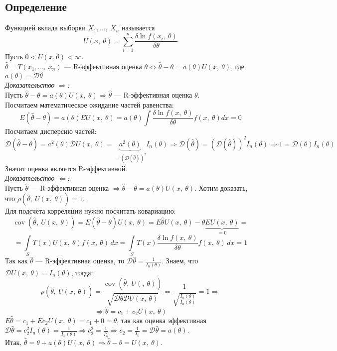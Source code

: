 \documentclass[12pt, a4paper]{article}
\newcommand{\sion}{\sum\limits_{i = 1}^{n}}
\newcommand{\dev}{\mathcal{D}}
\newcommand{\cov}{\operatorname{cov}}
\begin{document}
\subsection*{Определение}
Функцией вклада выборки $X_1,\dots,\ X_n$ называется
\[U(x,\ \theta) = \sion \frac{\delta \ln f(x_i,\ \theta)}{\delta \theta}\]
Пусть $0 < U(x, \theta) < \infty$.\\
$\hat{\theta} = T(x_1,\dots,\ x_n)$ --- R-эффективная оценка $\theta \Leftrightarrow \hat{\theta} - \theta = a(\theta) U(x,\ \theta)$, где $a(\theta) = \mathcal{D}\hat{\theta}$\\
\textit{Доказательство} $\Rightarrow$:\\
Пусть $\hat{\theta} - \theta = a(\theta) U(x,\ \theta) \Rightarrow \hat{\theta}$ --- R-эффективная оценка $\theta$.\\
Посчитаем математическое ожидание частей равенства:
\[E(\hat{\theta} - \theta) = a(\theta) EU(x,\ \theta) = a(\theta) \int \frac{\delta \ln f(x,\ \theta)}{\delta \theta} f(x,\ \theta) dx = 0\]
Посчитаем дисперсию частей:
\[\dev (\hat{\theta} - \theta) = a^2(\theta) \dev U(x,\ \theta) = \underset{=(\dev(\hat{\theta}))^2}{\underbrace{a^2(\theta)}} I_n(\theta)\Rightarrow \dev(\hat{\theta}) = (\dev(\hat{\theta}))^2 I_n(\theta)\Rightarrow 1 = \dev(\theta) I_n(\theta)\]
Значит оценка является R-эффективной.\\
\textit{Доказательство} $\Leftarrow$:\\
Пусть $\hat{\theta}$ --- R-эффективная оценка $\Rightarrow \hat{\theta} - \theta = a(\theta) U(x,\ \theta)$. Хотим доказать, что $\rho(\hat{\theta},\ U(x,\ \theta)) = 1$.\\
Для подсчёта корреляции нужно посчитать ковариацию:
\[\cov (\hat{\theta},\ U(x,\ \theta)) = E(\hat{\theta} - \theta) U(x,\ \theta) = E\hat{\theta} U(x,\ \theta) - \theta \underset{=0}{\underbrace{EU(x,\ \theta)}} =\]
\[= \int\limits_S T(x)U(x,\ \theta) f(x,\ \theta)\, dx = \int\limits_S T(x) \frac{\delta \ln f(x,\ \theta)}{\delta \theta}f(x,\ \theta)\, dx = 1\]
Так как $\hat{\theta}$ --- R-эффективная оценка, то $\dev \hat{\theta} = \frac{1}{I_n(\theta)}$. Знаем, что $\dev U(x,\ \theta) = I_n(\theta)$, тогда:
\[\rho(\hat{\theta},\ U(x,\ \theta)) = \frac{\cov (\hat{\theta},\ U(,\ \theta))}{\sqrt{\dev \hat{\theta} \dev U(x,\ \theta)}} = \frac{1}{\sqrt{\frac{I_n(\theta)}{I_n(\theta)}}} = 1\Rightarrow\]
\[\Rightarrow \hat{\theta} = c_1 + c_2U(x,\ \theta)\]
$E\hat{\theta} = c_1 + Ec_2 U(x,\ \theta) = c_1 + 0 = \theta$, так как оценка эффективная\\
$\dev \hat{\theta} = c_2^2 I_n(\theta) = \frac{1}{I_n(\theta)}\Rightarrow c_2^2 = \frac{1}{I_n^2}\Rightarrow c_2 = \frac{1}{I_n} = \dev\hat{\theta} = a(\theta)$.\\
Итак, $\hat{\theta} = \theta + a(\theta) U(x,\ \theta)\Rightarrow \hat{\theta} - \theta = U(x,\ \theta)$.
\end{document}
